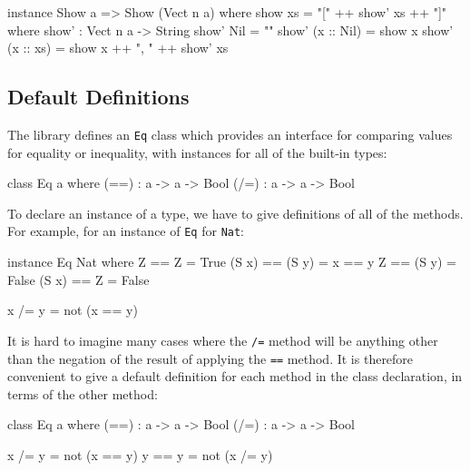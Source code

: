 \begin{code}
instance Show a => Show (Vect n a) where
    show xs = "[" ++ show' xs ++ "]" where
        show' : Vect n a -> String
        show' Nil        = ""
        show' (x :: Nil) = show x
        show' (x :: xs)  = show x ++ ", " ++ show' xs
\end{code}


\subsection{Default Definitions}

The library defines an \texttt{Eq} class which provides an interface for comparing values for equality or inequality, with instances for all of the built-in types:

\begin{code}
class Eq a where
    (==) : a -> a -> Bool
    (/=) : a -> a -> Bool
\end{code}

\noindent
To declare an instance of a type, we have to give definitions of all of the methods.
For example, for an instance of \texttt{Eq} for \texttt{Nat}:

\begin{code}
instance Eq Nat where
    Z     == Z     = True
    (S x) == (S y) = x == y
    Z     == (S y) = False
    (S x) == Z     = False

    x /= y = not (x == y)
\end{code}

\noindent
It is hard to imagine many cases where the \texttt{/=} method will be anything other than the negation of the result of applying the \texttt{==} method.
It is therefore convenient to give a default definition for each method in the class declaration, in terms of the other method:

\begin{code}
class Eq a where
    (==) : a -> a -> Bool
    (/=) : a -> a -> Bool

    x /= y = not (x == y)
    y == y = not (x /= y)
\end{code}

